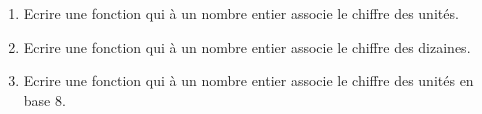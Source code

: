\begin{enumerate}
	\item Ecrire une fonction qui à un nombre entier associe le chiffre des unités.
	\item Ecrire une fonction qui à un nombre entier associe le chiffre des dizaines.
	\item Ecrire une fonction qui à un nombre entier associe le chiffre des unités en base 8.
\end{enumerate}
